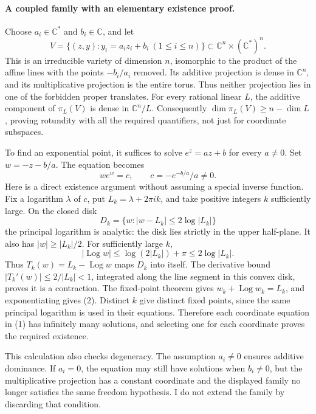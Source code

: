 \documentclass[11pt]{article}
\begin{document}
\paragraph{A coupled family with an elementary existence proof.}
Choose $a_i\in\mathbb C^*$ and $b_i\in\mathbb C$, and let
\[
 V=\{(z,y):y_i=a_i z_i+b_i\ (1\le i\le n)\}
 \subset\mathbb C^n\times(\mathbb C^*)^n.
                                                        \tag{1}
\]
This is an irreducible variety of dimension $n$, isomorphic to the
product of the affine lines with the points $-b_i/a_i$ removed. Its
additive projection is dense in $\mathbb C^n$, and its multiplicative
projection is the entire torus. Thus neither projection lies in one of
the forbidden proper translates. For every rational linear $L$, the
additive component of $\pi_L(V)$ is dense in $\mathbb C^n/L$.
Consequently $\dim\pi_L(V)\ge n-\dim L$, proving rotundity with all
the required quantifiers, not just for coordinate subspaces.

To find an exponential point, it suffices to solve $e^z=az+b$ for every
$a\ne0$. Set $w=-z-b/a$. The equation becomes
\[
 we^w=c,\qquad c=-e^{-b/a}/a\ne0.                     \tag{2}
\]
Here is a direct existence argument without assuming a special inverse
function. Fix a logarithm $\lambda$ of $c$, put
$L_k=\lambda+2\pi i k$, and take positive integers $k$ sufficiently
large. On the closed disk
\[
 D_k=\{w:|w-L_k|\le2\log|L_k|\}
\]
the principal logarithm is analytic: the disk lies strictly in the
upper half-plane. It also has $|w|\ge|L_k|/2$. For sufficiently large
$k$,
\[
 |\operatorname{Log}w|\le\log(2|L_k|)+\pi
 \le2\log|L_k|.
\]
Thus $T_k(w)=L_k-\operatorname{Log}w$ maps $D_k$ into itself.
The derivative bound $|T_k'(w)|\le2/|L_k|<1$, integrated along the
line segment in this convex disk, proves it is a contraction. The
fixed-point theorem gives $w_k+\operatorname{Log}w_k=L_k$, and
exponentiating gives (2). Distinct $k$ give distinct fixed points,
since the same principal logarithm is used in their equations.
Therefore each coordinate equation in (1) has infinitely many solutions,
and selecting one for each coordinate proves the required existence.

This calculation also checks degeneracy. The assumption $a_i\ne0$
ensures additive dominance. If $a_i=0$, the equation may still have
solutions when $b_i\ne0$, but the multiplicative projection has a
constant coordinate and the displayed family no longer satisfies the
same freedom hypothesis. I do not extend the family by discarding that
condition.
\end{document}
